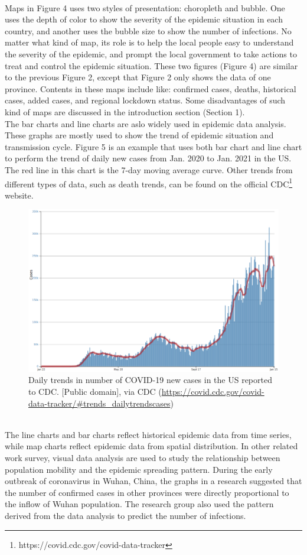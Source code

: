 \documentclass[sigplan,screen]{acmart}
\begin{document}
\\
Maps in Figure 4 uses two styles of presentation: choropleth and bubble.
One uses the depth of color to show the severity of the epidemic situation in each country, and another uses the bubble size to show the number of infections.
No matter what kind of map, its role is to help the local people easy to understand the severity of the epidemic, and prompt the local government to take actions to treat and control the epidemic situation.
These two figures (Figure 4) are similar to the previous Figure 2, except that Figure 2 only shows the data of one province.
Contents in these maps include like: confirmed cases, deaths, historical cases, added cases, and regional lockdown status.
Some disadvantages of such kind of maps are discussed in the introduction section (Section 1).
\\
The bar charts and line charts are aslo widely used in epidemic data analysis.
These graphs are mostly used to show the trend of epidemic situation and transmission cycle.
Figure 5 is an example that uses both bar chart and line chart to perform the trend of daily new cases from Jan. 2020 to Jan. 2021 in the US. The red line in this chart is the 7-day moving average curve.
Other trends from different types of data, such as death trends, can be found on the official CDC\footnote{https://covid.cdc.gov/covid-data-tracker} website.
\begin{figure}[htb]
	\centering\includegraphics[width=\linewidth]{linebar-us-1-15.png}
	\caption{Daily trends in number of COVID-19 new cases in the US reported to CDC. [Public domain], via CDC (\url{https://covid.cdc.gov/covid-data-tracker/\#trends_dailytrendscases})}
\end{figure}
\\
The line charts and bar charts reflect historical epidemic data from time series, while map charts reflect epidemic data from spatial distribution.
In other related work survey, visual data analysis are used to study the relationship between population mobility and the epidemic spreading pattern.
During the early outbreak of coronavirus in Wuhan, China, the graphs in a research suggested that the number of confirmed cases in other provinces were directly proportional to the inflow of Wuhan population.
The research group also used the pattern derived from the data analysis to predict the number of infections.\cite{chen2020data}
\end{document}
